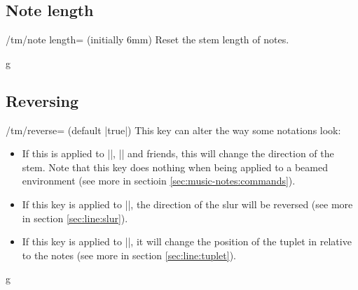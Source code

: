 \subsection{Note length}\label{sec:custom:note-length}
\begin{key}{/tm/note length= (initially 6mm)}
  Reset the stem length of notes.
\end{key}
\begin{codeexample}[]
\begin{tmline}
\begin{tmstaff}{g}{}
  \begin{tmbeam}[note length=1.7cm]
  \end{tmbeam}
\end{tmstaff}
\end{tmline}
\end{codeexample}
\subsection{Reversing}\label{sec:custom:reverse}
\begin{key}{/tm/reverse= (default |true|)}
  This key can alter the way some notations look:

  \begin{itemize}
    \item If this is applied to |\tmhalf|, |\tmquarter| and friends, this will 
    change the direction of the stem. Note that this key does nothing when being 
    applied to a beamed environment (see more in sectioin \ref{sec:music-notes:commands}).
    \item If this key is applied to |\tmslur|, the direction of the 
    slur will be reversed (see more in section \ref{sec:line:slur}).
    \item If this key is applied to |\tmtuplets|, it will change the position of 
    the tuplet in relative to the notes (see more in section \ref{sec:line:tuplet}).
  \end{itemize}
\end{key}
\begin{codeexample}[]
\begin{tmline}
\begin{tmstaff}{g}{}
\end{tmstaff}
\end{tmline}
\end{codeexample}
